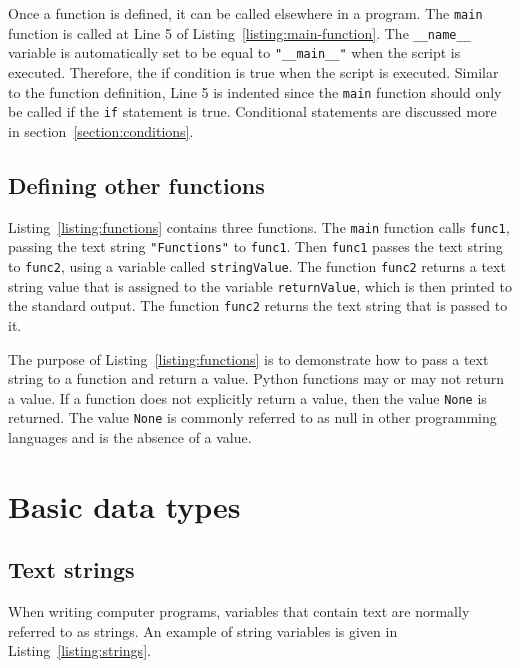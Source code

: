 \documentclass[11pt,a4paper]{article}
\begin{document}
Once a function is defined, it can be called elsewhere in a program.  The \texttt{main} function is called at Line 5 of Listing~\ref{listing:main-function}.  The \texttt{\_\_name\_\_} variable is automatically set to be equal to \texttt{"\_\_main\_\_"} when the script is executed.  Therefore, the if condition is true when the script is executed.  Similar to the function definition, Line 5 is indented since the \texttt{main} function should only be called if the \texttt{if} statement is true.  Conditional statements are discussed more in section~\ref{section:conditions}.

\subsection{Defining other functions}

Listing~\ref{listing:functions} contains three functions.  The \texttt{main} function calls \texttt{func1}, passing the text string \texttt{"Functions"} to \texttt{func1}.  Then \texttt{func1} passes the text string to \texttt{func2}, using a variable called \texttt{stringValue}.  The function \texttt{func2} returns a text string value that is assigned to the variable \texttt{returnValue}, which is then printed to the standard output.  The function \texttt{func2} returns the text string that is passed to it.



The purpose of Listing~\ref{listing:functions} is to demonstrate how to pass a text string to a function and return a value.  Python functions may or may not return a value.  If a function does not explicitly return a value, then the value \texttt{None} is returned.  The value \texttt{None} is commonly referred to as null in other programming languages and is the absence of a value.

\section{Basic data types}

\subsection{Text strings \label{section:strings}}

When writing computer programs, variables that contain text are normally referred to as strings.  An example of string variables is given in Listing~\ref{listing:strings}.
\end{document}
